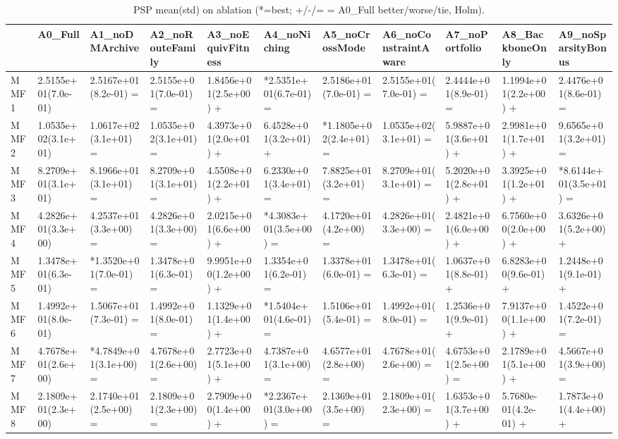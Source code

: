 \begin{table}[t]
\centering
\caption{PSP mean(std) on ablation (*=best; +/-/= = A0_Full better/worse/tie, Holm).}
\label{tab:ablation_PSP}
\begin{tabular}{lllllllllll}
\toprule
 & A0\_Full & A1\_noDMArchive & A2\_noRouteFamily & A3\_noEquivFitness & A4\_noNiching & A5\_noCrossMode & A6\_noConstraintAware & A7\_noPortfolio & A8\_BackboneOnly & A9\_noSparsityBonus \\
\midrule
MMF1 & 2.5155e+01(7.0e-01) & 2.5167e+01(8.2e-01) = & 2.5155e+01(7.0e-01) = & 1.8456e+01(2.5e+00) + & *2.5351e+01(6.7e-01) = & 2.5186e+01(7.0e-01) = & 2.5155e+01(7.0e-01) = & 2.4444e+01(8.9e-01) = & 1.1994e+01(2.2e+00) + & 2.4476e+01(8.6e-01) = \\
MMF2 & 1.0535e+02(3.1e+01) & 1.0617e+02(3.1e+01) = & 1.0535e+02(3.1e+01) = & 4.3973e+01(2.0e+01) + & 6.4528e+01(3.2e+01) + & *1.1805e+02(2.4e+01) = & 1.0535e+02(3.1e+01) = & 5.9887e+01(3.6e+01) + & 2.9981e+01(1.7e+01) + & 9.6565e+01(3.2e+01) = \\
MMF3 & 8.2709e+01(3.1e+01) & 8.1966e+01(3.1e+01) = & 8.2709e+01(3.1e+01) = & 4.5508e+01(2.2e+01) + & 6.2330e+01(3.4e+01) = & 7.8825e+01(3.2e+01) = & 8.2709e+01(3.1e+01) = & 5.2020e+01(2.8e+01) + & 3.3925e+01(1.2e+01) + & *8.6144e+01(3.5e+01) = \\
MMF4 & 4.2826e+01(3.3e+00) & 4.2537e+01(3.3e+00) = & 4.2826e+01(3.3e+00) = & 2.0215e+01(6.6e+00) + & *4.3083e+01(3.5e+00) = & 4.1720e+01(4.2e+00) = & 4.2826e+01(3.3e+00) = & 2.4821e+01(6.0e+00) + & 6.7560e+00(2.0e+00) + & 3.6326e+01(5.2e+00) + \\
MMF5 & 1.3478e+01(6.3e-01) & *1.3520e+01(7.0e-01) = & 1.3478e+01(6.3e-01) = & 9.9951e+00(1.2e+00) + & 1.3354e+01(6.2e-01) = & 1.3378e+01(6.0e-01) = & 1.3478e+01(6.3e-01) = & 1.0637e+01(8.8e-01) + & 6.8283e+00(9.6e-01) + & 1.2448e+01(9.1e-01) + \\
MMF6 & 1.4992e+01(8.0e-01) & 1.5067e+01(7.3e-01) = & 1.4992e+01(8.0e-01) = & 1.1329e+01(1.4e+00) + & *1.5404e+01(4.6e-01) = & 1.5106e+01(5.4e-01) = & 1.4992e+01(8.0e-01) = & 1.2536e+01(9.9e-01) + & 7.9137e+00(1.1e+00) + & 1.4522e+01(7.2e-01) = \\
MMF7 & 4.7678e+01(2.6e+00) & *4.7849e+01(3.1e+00) = & 4.7678e+01(2.6e+00) = & 2.7723e+01(5.1e+00) + & 4.7387e+01(3.1e+00) = & 4.6577e+01(2.8e+00) = & 4.7678e+01(2.6e+00) = & 4.6753e+01(2.5e+00) = & 2.1789e+01(5.1e+00) + & 4.5667e+01(3.9e+00) = \\
MMF8 & 2.1809e+01(2.3e+00) & 2.1740e+01(2.5e+00) = & 2.1809e+01(2.3e+00) = & 2.7909e+00(1.4e+00) + & *2.2367e+01(3.0e+00) = & 2.1369e+01(3.5e+00) = & 2.1809e+01(2.3e+00) = & 1.6353e+01(3.7e+00) + & 5.7680e-01(4.2e-01) + & 1.7873e+01(4.4e+00) + \\
\bottomrule
\end{tabular}
\end{table}
